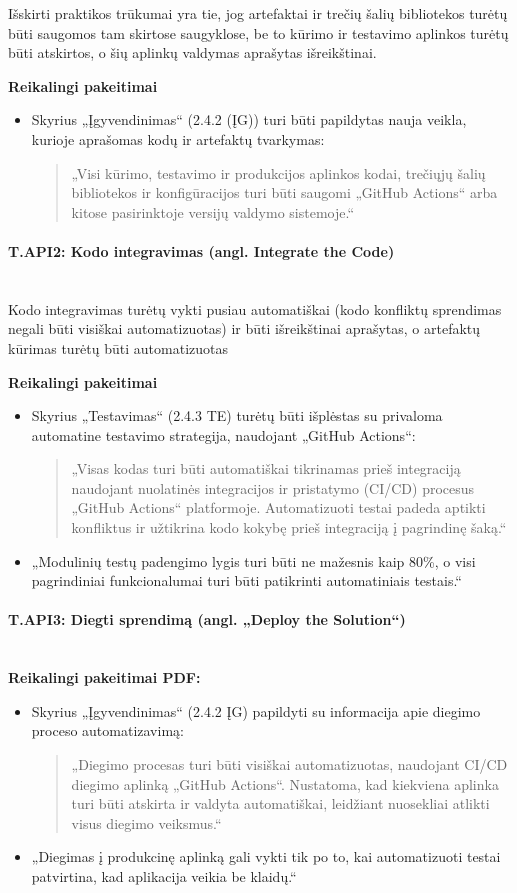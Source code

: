 \documentclass{article}
\newcommand{\subsubsubsection}[1]{\paragraph{#1}\mbox{}\\}
\begin{document}
Išskirti praktikos trūkumai yra tie, jog artefaktai ir trečių šalių bibliotekos turėtų būti saugomos tam skirtose saugyklose, be to kūrimo ir testavimo aplinkos turėtų būti atskirtos, o šių aplinkų valdymas aprašytas išreikštinai. 

\textbf{Reikalingi pakeitimai }
\begin{itemize}
    \item Skyrius „Įgyvendinimas“ (2.4.2 (ĮG)) turi būti papildytas nauja veikla, kurioje aprašomas kodų ir artefaktų tvarkymas:
    \begin{quote}
    „Visi kūrimo, testavimo ir produkcijos aplinkos kodai, trečiųjų šalių bibliotekos ir konfigūracijos turi būti saugomi „GitHub Actions“ arba kitose pasirinktoje versijų valdymo sistemoje.“
    \end{quote}
\end{itemize}

\subsubsubsection{T.API2: Kodo integravimas (angl. Integrate the Code)}

Kodo integravimas turėtų vykti pusiau automatiškai (kodo konfliktų sprendimas negali būti visiškai automatizuotas) ir būti išreikštinai aprašytas, o artefaktų kūrimas turėtų būti automatizuotas

\textbf{Reikalingi pakeitimai}
\begin{itemize}
    \item Skyrius „Testavimas“ (2.4.3 TE) turėtų būti išplėstas su privaloma automatine testavimo strategija, naudojant „GitHub Actions“:
    \begin{quote}
    „Visas kodas turi būti automatiškai tikrinamas prieš integraciją naudojant nuolatinės integracijos ir pristatymo (CI/CD) procesus „GitHub Actions“ platformoje. Automatizuoti testai padeda aptikti konfliktus ir užtikrina kodo kokybę prieš integraciją į pagrindinę šaką.“
    \end{quote}
    \item „Modulinių testų padengimo lygis turi būti ne mažesnis kaip 80\%, o visi pagrindiniai funkcionalumai turi būti patikrinti automatiniais testais.“
\end{itemize}


\subsubsubsection{T.API3: Diegti sprendimą (angl. „Deploy the Solution“) }

\textbf{Reikalingi pakeitimai PDF:}
\begin{itemize}
    \item Skyrius „Įgyvendinimas“ (2.4.2 ĮG) papildyti su informacija apie diegimo proceso automatizavimą:
    \begin{quote}
    „Diegimo procesas turi būti visiškai automatizuotas, naudojant CI/CD diegimo aplinką „GitHub Actions“. Nustatoma, kad kiekviena aplinka turi būti atskirta ir valdyta automatiškai, leidžiant nuosekliai atlikti visus diegimo veiksmus.“
    \end{quote}
    \item „Diegimas į produkcinę aplinką gali vykti tik po to, kai automatizuoti testai patvirtina, kad aplikacija veikia be klaidų.“
\end{itemize}
\end{document}
